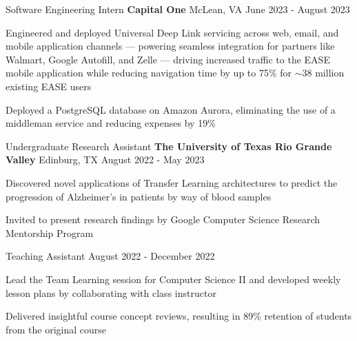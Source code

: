 \begin{cventries}
  \cventry
    {Software Engineering Intern}
    {\textbf{Capital One}}
    {McLean, VA}
    {June 2023 - August 2023}
    {
      \begin{cvitems}
        \item{Engineered and deployed Universal Deep Link servicing across web, email, and mobile application channels --- powering seamless integration for partners like Walmart, Google Autofill, and Zelle --- driving increased traffic to the EASE mobile application while reducing navigation time by up to 75\% for $\sim$38 million existing EASE users}
        \item{Deployed a PostgreSQL database on Amazon Aurora, eliminating the use of a middleman service and reducing expenses by 19\%}
      \end{cvitems}
    }


  \cventry
    {Undergraduate Research Assistant}
    {\textbf{The University of Texas Rio Grande Valley}}
    {Edinburg, TX}
    {August 2022 - May 2023}
    {
      \begin{cvitems}
        \item{Discovered novel applications of Transfer Learning architectures to predict the progression of Alzheimer's in patients by way of blood samples}
        \item{Invited to present research findings by Google Computer Science Research Mentorship Program}
      \end{cvitems}
    }

  \cventry
    {Teaching Assistant}
    {}
    {}
    {August 2022 - December 2022}
    {
      \begin{cvitems}
        \item{Lead the Team Learning session for Computer Science II and developed weekly lesson plans by collaborating with class instructor}
        \item{Delivered insightful course concept reviews, resulting in 89\% retention of students from the original course}
      \end{cvitems}
    }

\end{cventries}
